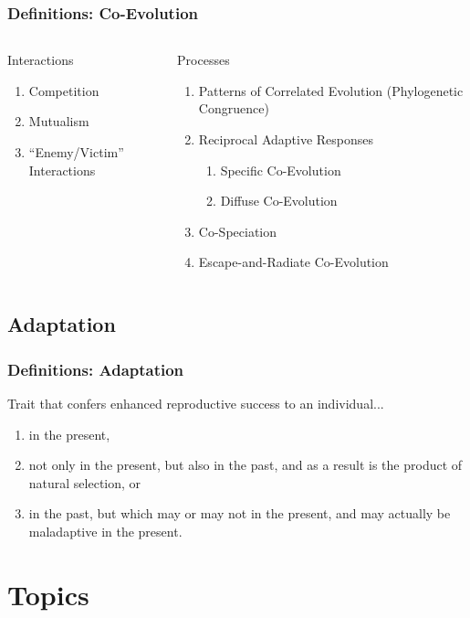 \documentclass{beamer}
\begin{document}
\begin{frame}
\frametitle{Definitions: Co-Evolution}
\begin{columns}
\begin{column}{.5\textwidth}
Interactions
\begin{enumerate}
\item Competition
\item Mutualism
\item ``Enemy/Victim'' Interactions
\end{enumerate}
\end{column}
\begin{column}{.5\textwidth}
Processes
\begin{enumerate}
\item Patterns of Correlated Evolution (Phylogenetic Congruence)
\item Reciprocal Adaptive Responses
\begin{enumerate}
\item Specific Co-Evolution
\item Diffuse Co-Evolution
\end{enumerate}
\item Co-Speciation
\item Escape-and-Radiate Co-Evolution
\end{enumerate}
\end{column}
\end{columns}
\end{frame}

\subsection[Adaptation]{Adaptation}

\begin{frame}
\frametitle{Definitions: Adaptation}
Trait that confers enhanced reproductive success to an individual...
\begin{enumerate}
\item in the present,
\item not only in the present, but also in the past, and as a result is the product of natural selection, or
\item in the past, but which may or may not in the present, and may actually be maladaptive in the present.
\end{enumerate}
\end{frame}

\section[Topics]{Topics}
\end{document}
